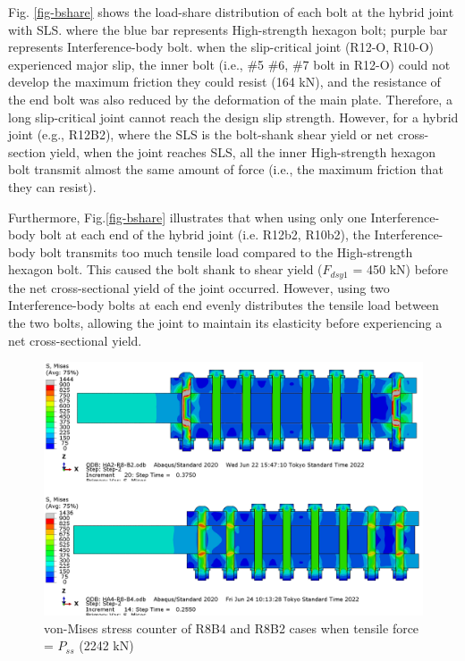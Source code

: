 Fig. \ref{fig-bshare} shows the load-share distribution of each bolt at the hybrid joint with SLS. where the blue bar represents High-strength hexagon bolt; purple bar represents Interference-body bolt. when the slip-critical joint (R12-O, R10-O) experienced major slip, the inner bolt (i.e., \#5 \#6, \#7 bolt in R12-O) could not develop the maximum friction they could resist (164 kN), and the resistance of the end bolt was also reduced by the deformation of the main plate. Therefore, a long slip-critical joint cannot reach the design slip strength. However, for a hybrid joint (e.g., R12B2), where the SLS is the bolt-shank shear yield or net cross-section yield, when the joint reaches SLS, all the inner High-strength hexagon bolt transmit almost the same amount of force (i.e., the maximum friction that they can resist). 

Furthermore, Fig.\ref{fig-bshare} illustrates that when using only one Interference-body bolt at each end of the hybrid joint (i.e. R12b2, R10b2), the Interference-body bolt transmits too much tensile load compared to the High-strength hexagon bolt. This caused the bolt shank to shear yield ($F_{dsy1}$ = 450 kN) before the net cross-sectional yield of the joint occurred. However, using two Interference-body bolts at each end evenly distributes the tensile load between the two bolts, allowing the joint to maintain its elasticity before experiencing a net cross-sectional yield.


\begin{figure}[htbp]
    \centering
    \includegraphics[width=0.9\linewidth]{imgs/ch5/r8b24misescs0-1940.png}
    \caption{von-Mises stress counter of R8B4 and R8B2 cases when tensile force = $P_{ss}$ (2242 kN)}
    \label{fig-r10b24boltmises}
\end{figure}

